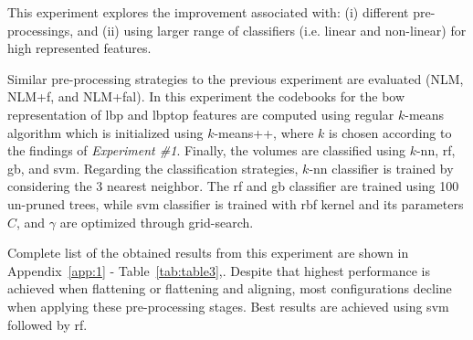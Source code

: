 This experiment explores the improvement associated with: (i) different pre-processings, and (ii) using larger range of classifiers (i.e. linear and non-linear) for high represented features.

Similar pre-processing strategies to the previous experiment are evaluated (NLM, NLM+\acs{f}, and NLM+\acs{fal}).
In this experiment the codebooks for the \ac{bow} representation of \ac{lbp} and \ac{lbptop} features are computed using regular $k$-means algorithm which is initialized using $k$-means++, where $k$ is chosen according to the findings of \emph{Experiment \#1}.
Finally, the volumes are classified using $k$-\ac{nn}, \ac{rf}, \ac{gb}, and \ac{svm}.
Regarding the classification strategies, $k$-\ac{nn} classifier is trained by considering the 3 nearest neighbor.
The \ac{rf} and \ac{gb} classifier are trained using 100 un-pruned trees, while \ac{svm} classifier is trained with \ac{rbf} kernel and its parameters $C$, and $\gamma$ are optimized through grid-search.

Complete list of the obtained results from this experiment are shown in Appendix~\ref{app:1} - Table~\ref{tab:table3},. Despite that highest performance is achieved when flattening or flattening and aligning, most configurations decline when applying these pre-processing stages. Best results are achieved using \ac{svm} followed by \ac{rf}.

